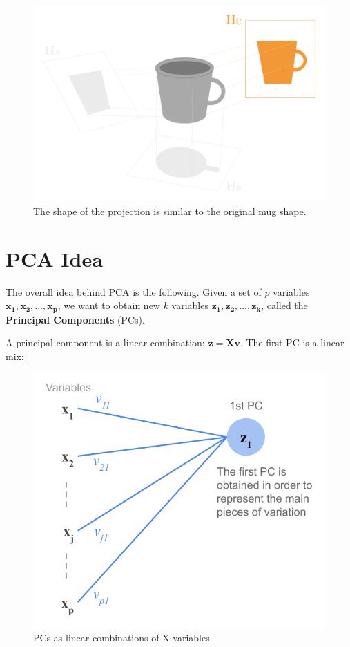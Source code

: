 \documentclass[]{book}
\begin{document}
\begin{figure}

{\centering \includegraphics[width=0.5\linewidth]{images/pca/mug-subspace} 

}

\caption{The shape of the projection is similar to the original mug shape.}\label{fig:unnamed-chunk-26}
\end{figure}

\hypertarget{pca-idea}{%
\section{PCA Idea}\label{pca-idea}}

The overall idea behind PCA is the following. Given a set of \(p\) variables
\(\mathbf{x_1}, \mathbf{x_2}, \dots, \mathbf{x_p}\), we want to obtain new \(k\) variables
\(\mathbf{z_1}, \mathbf{z_2}, \dots, \mathbf{z_k}\), called the \textbf{Principal Components} (PCs).

A principal component is a linear combination: \(\mathbf{z} = \mathbf{Xv}\).
The first PC is a linear mix:

\begin{figure}

{\centering \includegraphics[width=0.5\linewidth]{images/pca/pca-path-diag1} 

}

\caption{PCs as linear combinations of X-variables}\label{fig:unnamed-chunk-27}
\end{figure}
\end{document}
